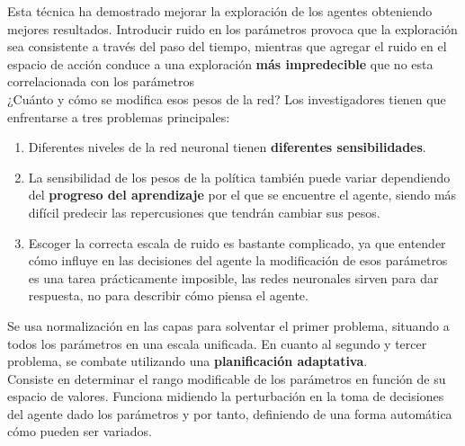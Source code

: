\documentclass[11pt,fleqn]{book} %
\begin{document}
Esta técnica ha demostrado mejorar la exploración de los agentes obteniendo mejores resultados. Introducir ruido en los parámetros provoca que la exploración sea consistente a través del paso del tiempo, mientras que agregar el ruido en el espacio de acción conduce a una exploración \textbf{más impredecible} que no esta correlacionada con los parámetros \\

¿Cuánto y cómo se modifica esos pesos de la red? Los investigadores tienen que enfrentarse a tres problemas principales: \\

\begin{enumerate}
	\item Diferentes niveles de la red neuronal tienen \textbf{diferentes sensibilidades}. \\ 
	
	\item La sensibilidad de los pesos de la política también puede variar dependiendo del \textbf{progreso del aprendizaje} por el que se encuentre el agente, siendo más difícil predecir las repercusiones que tendrán cambiar sus pesos. \\ 
	
	\item Escoger la correcta escala de ruido es bastante complicado, ya que entender cómo influye en las decisiones del agente la modificación de esos parámetros es una tarea prácticamente imposible, las redes neuronales sirven para dar respuesta, no para describir cómo piensa el agente. \\
\end{enumerate}

Se usa normalización en las capas para solventar el primer problema, situando a todos los parámetros en una escala unificada. En cuanto al segundo y tercer problema, se combate utilizando una \textbf{planificación adaptativa}. \\

Consiste en determinar el rango modificable de los parámetros en función de su espacio de valores. Funciona midiendo la perturbación en la toma de decisiones del agente dado los parámetros y por tanto, definiendo de una forma automática cómo pueden ser variados. \cite{article:DDPG} \cite{article:DDPG_2}
\end{document}
